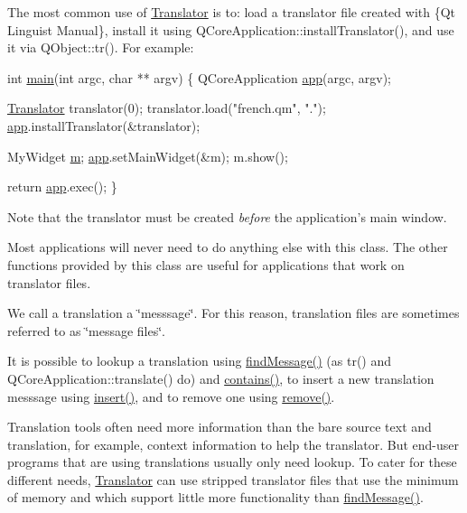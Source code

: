 The most common use of \hyperlink{classTranslator}{Translator} is to\+: load a translator file created with \{Qt Linguist Manual\}, install it using Q\+Core\+Application\+::install\+Translator(), and use it via Q\+Object\+::tr(). For example\+:


\begin{DoxyCode}
\textcolor{keywordtype}{int} \hyperlink{namespacedriver_1_1LOGITECH__GAMEPAD__DRIVER_aaa658f6556352e0d77c8437b019f41f9}{main}(\textcolor{keywordtype}{int} argc, \textcolor{keywordtype}{char} ** argv)
\{
    QCoreApplication \hyperlink{namespacelang_aa1745a5b4f252cc94c0176918ef4e7a2}{app}(argc, argv);

    \hyperlink{classTranslator}{Translator} translator(0);
    translator.load(\textcolor{stringliteral}{"french.qm"}, \textcolor{stringliteral}{"."});
    \hyperlink{namespacelang_aa1745a5b4f252cc94c0176918ef4e7a2}{app}.installTranslator(&translator);

    MyWidget \hyperlink{indexexpr_8h_ab72fdb4031d47b75ab26dd18a437bcdc}{m};
    \hyperlink{namespacelang_aa1745a5b4f252cc94c0176918ef4e7a2}{app}.setMainWidget(&m);
    m.show();

    \textcolor{keywordflow}{return} \hyperlink{namespacelang_aa1745a5b4f252cc94c0176918ef4e7a2}{app}.exec();
\}
\end{DoxyCode}
 Note that the translator must be created {\itshape before} the application's main window.

Most applications will never need to do anything else with this class. The other functions provided by this class are useful for applications that work on translator files.

We call a translation a \char`\"{}messsage\char`\"{}. For this reason, translation files are sometimes referred to as \char`\"{}message files\char`\"{}.

It is possible to lookup a translation using \hyperlink{classTranslator_ad8ed775f8a3375e029fc321d85e35de6}{find\+Message()} (as tr() and Q\+Core\+Application\+::translate() do) and \hyperlink{classTranslator_a64287b3ed668ce3620548d2e8d5d0d1d}{contains()}, to insert a new translation messsage using \hyperlink{classTranslator_a899fe5210b7f0c9c1aafe3c875be08b4}{insert()}, and to remove one using \hyperlink{classTranslator_abeaed252a6d759954efa4de668bea2ad}{remove()}.

Translation tools often need more information than the bare source text and translation, for example, context information to help the translator. But end-\/user programs that are using translations usually only need lookup. To cater for these different needs, \hyperlink{classTranslator}{Translator} can use stripped translator files that use the minimum of memory and which support little more functionality than \hyperlink{classTranslator_ad8ed775f8a3375e029fc321d85e35de6}{find\+Message()}.

